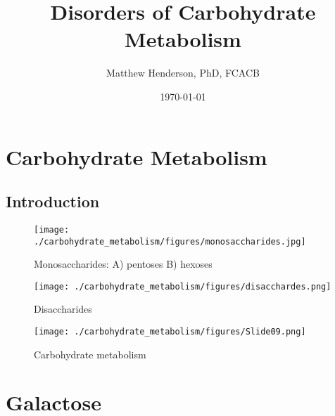 \documentclass{scrartcl}
\author{Matthew Henderson, PhD, FCACB}
\date{\today}
\title{Disorders of Carbohydrate Metabolism}
\begin{document}
\maketitle
\setcounter{tocdepth}{2}
\tableofcontents


\section{Carbohydrate Metabolism}
\label{sec:org84c9e6c}
\subsection{Introduction}
\label{sec:orgaead782}

\begin{figure}[htbp]
\centering
\texttt{[image: ./carbohydrate\_metabolism/figures/monosaccharides.jpg]}
\caption{\label{fig:org8ce68ae}
Monosaccharides: A) pentoses B) hexoses}
\end{figure}

\begin{figure}[htbp]
\centering
\texttt{[image: ./carbohydrate\_metabolism/figures/disacchardes.png]}
\caption{\label{fig:orge4a010e}
Disaccharides}
\end{figure}

\begin{figure}[htbp]
\centering
\texttt{[image: ./carbohydrate\_metabolism/figures/Slide09.png]}
\caption{\label{fig:orgdd734f2}
Carbohydrate metabolism}
\end{figure}

\section{Galactose}
\label{sec:org8e6a7e8}
\end{document}
